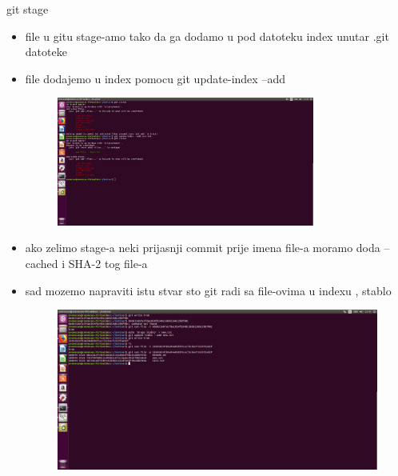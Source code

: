 \documentclass[]{beamer}
\begin{document}
\begin{frame}{git stage}

\begin{itemize}
	\item file u gitu stage-amo tako da ga dodamo u pod datoteku index unutar .git datoteke
	\item file dodajemo u index pomocu git update-index --add
	\begin{figure}
		\centering
	\includegraphics[width=0.8\textwidth]{./slike/cetvrta_slika.jpg}
	\end{figure}
	\item ako zelimo stage-a neki prijasnji commit prije imena file-a moramo doda --cached i SHA-2 tog file-a
	\item sad mozemo napraviti istu stvar sto git radi sa file-ovima u indexu , stablo
	\begin{figure}
		\centering
	\includegraphics[width=1\textwidth]{./slike/peta_slika.jpg}
	\end{figure}
		
\end{itemize}


\end{frame}
\end{document}
